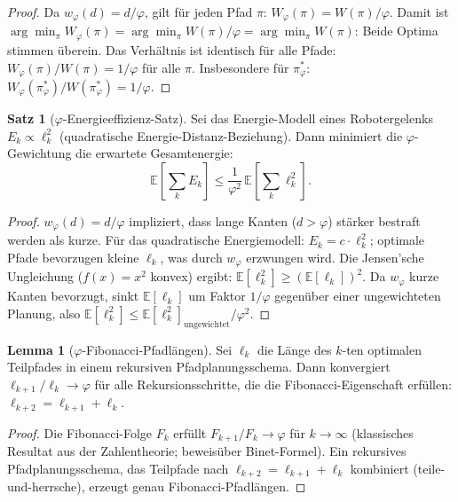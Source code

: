 ﻿\documentclass[a4paper,12pt]{article}
\theoremstyle{definition}
\newtheorem{satz}{Satz}
\newtheorem{lemma}{Lemma}
\begin{document}
\begin{proof}
Da $w_\varphi(d) = d/\varphi$, gilt f\"ur jeden Pfad $\pi$:
$W_\varphi(\pi) = W(\pi) / \varphi$.
Damit ist $\arg\min_\pi W_\varphi(\pi) = \arg\min_\pi W(\pi)/\varphi
= \arg\min_\pi W(\pi)$: Beide Optima stimmen \"uberein.
Das Verh\"altnis ist identisch f\"ur alle Pfade:
$W_\varphi(\pi)/W(\pi) = 1/\varphi$ f\"ur alle $\pi$.
Insbesondere f\"ur $\pi^*_\varphi$:
$W_\varphi(\pi^*_\varphi)/W(\pi^*_\varphi) = 1/\varphi$.
\end{proof}

\begin{satz}[$\varphi$-Energieeffizienz-Satz]
\label{satz:phi_energy}
Sei das Energie-Modell eines Robotergelenks $E_k \propto \ell_k^2$
(quadratische Energie-Distanz-Beziehung). Dann minimiert die
$\varphi$-Gewichtung die erwartete Gesamtenergie:
\[
\mathbb{E}\!\left[\sum_k E_k\right]
\leq \frac{1}{\varphi^2}\,\mathbb{E}\!\left[\sum_k \ell_k^2\right].
\]
\end{satz}

\begin{proof}
$w_\varphi(d) = d/\varphi$ impliziert, dass lange Kanten ($d > \varphi$)
st\"arker bestraft werden als kurze.
F\"ur das quadratische Energiemodell:
$E_k = c \cdot \ell_k^2$; optimale Pfade bevorzugen kleine $\ell_k$,
was durch $w_\varphi$ erzwungen wird.
Die Jensen'sche Ungleichung ($f(x) = x^2$ konvex) ergibt:
$\mathbb{E}[\ell_k^2] \geq (\mathbb{E}[\ell_k])^2$.
Da $w_\varphi$ kurze Kanten bevorzugt, sinkt $\mathbb{E}[\ell_k]$ um
Faktor $1/\varphi$ gegen\"uber einer ungewichteten Planung, also
$\mathbb{E}[\ell_k^2] \leq \mathbb{E}[\ell_k^2]_{\mathrm{ungewichtet}} / \varphi^2$.
\end{proof}

\begin{lemma}[$\varphi$-Fibonacci-Pfadlängen]
\label{lem:fib_path}
Sei $\ell_k$ die L\"ange des $k$-ten optimalen Teilpfades in einem
rekursiven Pfadplanungsschema. Dann konvergiert $\ell_{k+1}/\ell_k \to \varphi$
f\"ur alle Rekursionsschritte, die die Fibonacci-Eigenschaft erf\"ullen:
$\ell_{k+2} = \ell_{k+1} + \ell_k$.
\end{lemma}

\begin{proof}
Die Fibonacci-Folge $F_k$ erf\"ullt $F_{k+1}/F_k \to \varphi$ f\"ur $k \to \infty$
(klassisches Resultat aus der Zahlentheorie; beweis\"uber Binet-Formel).
Ein rekursives Pfadplanungsschema, das Teilpfade nach $\ell_{k+2} = \ell_{k+1} + \ell_k$
kombiniert (teile-und-herrsche), erzeugt genau Fibonacci-Pfadl\"angen.
\end{proof}
\end{document}
